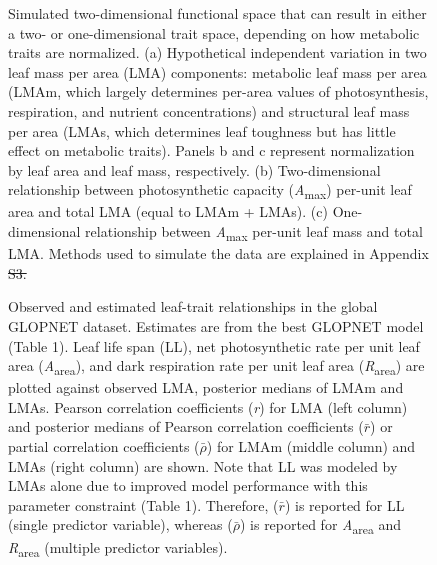 \documentclass[
  12pt,
  letterpaper,
  DIV=11,
  numbers=noendperiod]{scrartcl}
\providecommand{\DIFadd}[1]{{\protect\color{blue}\uwave{#1}}} %
\providecommand{\DIFdel}[1]{{\protect\color{red}\sout{#1}}}                      %
\providecommand{\DIFaddbegin}{} %
\providecommand{\DIFaddend}{} %
\providecommand{\DIFaddFL}[1]{\DIFadd{#1}} %
\providecommand{\DIFdelFL}[1]{\DIFdel{#1}} %
\providecommand{\DIFaddbeginFL}{} %
\providecommand{\DIFaddendFL}{} %
\providecommand{\DIFdelbeginFL}{} %
\providecommand{\DIFdelendFL}{} %
\newcommand{\DIFscaledelfig}{0.5}
\newlength{\DIFdelgraphicswidth} %
\newlength{\DIFdelgraphicsheight} %
\newcommand{\DIFaddincludegraphics}[2][]{{\color{blue}\fbox{\DIFOincludegraphics[#1]{#2}}}} %
\newcommand{\DIFdelincludegraphics}[2][]{%
\sbox{\DIFdelgraphicsbox}{\DIFOincludegraphics[#1]{#2}}%
\settoboxwidth{\DIFdelgraphicswidth}{\DIFdelgraphicsbox} %
\settoboxtotalheight{\DIFdelgraphicsheight}{\DIFdelgraphicsbox} %
\scalebox{\DIFscaledelfig}{%
\parbox[b]{\DIFdelgraphicswidth}{\usebox{\DIFdelgraphicsbox}\\[-\baselineskip] \rule{\DIFdelgraphicswidth}{0em}}\llap{\resizebox{\DIFdelgraphicswidth}{\DIFdelgraphicsheight}{%
\setlength{\unitlength}{\DIFdelgraphicswidth}%
\begin{picture}(1,1)%
\thicklines\linethickness{2pt} %
{\color[rgb]{1,0,0}\put(0,0){\framebox(1,1){}}}%
{\color[rgb]{1,0,0}\put(0,0){\line( 1,1){1}}}%
{\color[rgb]{1,0,0}\put(0,1){\line(1,-1){1}}}%
\end{picture}%
}\hspace*{3pt}}} %
} %
\DeclareRobustCommand{\DIFaddbegin}{\DIFOaddbegin \let\includegraphics\DIFaddincludegraphics} %
\DeclareRobustCommand{\DIFaddend}{\DIFOaddend \let\includegraphics\DIFOincludegraphics} %
\DeclareRobustCommand{\DIFaddbeginFL}{\DIFOaddbeginFL \let\includegraphics\DIFaddincludegraphics} %
\DeclareRobustCommand{\DIFaddendFL}{\DIFOaddendFL \let\includegraphics\DIFOincludegraphics} %
\DeclareRobustCommand{\DIFdelbeginFL}{\DIFOdelbeginFL \let\includegraphics\DIFdelincludegraphics} %
\DeclareRobustCommand{\DIFdelendFL}{\DIFOaddendFL \let\includegraphics\DIFOincludegraphics} %
\begin{document}
\newpage

\begin{figure}


\caption{\label{fig-hypo}Simulated two-dimensional functional space that
can result in either a two- or one-dimensional trait space, depending on
how metabolic traits are normalized. (a) Hypothetical independent
variation in two leaf mass per area (LMA) components: metabolic leaf
mass per area (LMAm, which largely determines per-area values of
photosynthesis, respiration, and nutrient concentrations) and structural
leaf mass per area (LMAs, which determines leaf toughness but has little
effect on metabolic traits). Panels b and c represent normalization by
leaf area and leaf mass, respectively. (b) Two-dimensional relationship
between photosynthetic capacity (\emph{A}\textsubscript{max}) per-unit
leaf area and total LMA (equal to LMAm + LMAs). (c) One-dimensional
relationship between \emph{A}\textsubscript{max} per-unit leaf mass and
total LMA. Methods used to simulate the data are explained in Appendix
\DIFdelbeginFL \DIFdelFL{S3.}\DIFdelendFL \DIFaddbeginFL \DIFaddFL{S8}\DIFaddendFL }

\end{figure}%

\DIFaddbegin \newpage

\DIFaddend \begin{figure}


\caption{\label{fig-gl_point}Observed and estimated leaf-trait
relationships in the global GLOPNET dataset. Estimates are from the best
GLOPNET model (Table 1). Leaf life span (LL), net photosynthetic rate
per unit leaf area (\emph{A}\textsubscript{area}), and dark respiration
rate per unit leaf area (\emph{R}\textsubscript{area}) are plotted
against observed LMA, posterior medians of LMAm and LMAs. Pearson
correlation coefficients (\emph{r}) for LMA (left column) and posterior
medians of Pearson correlation coefficients (\(\bar{r}\)) or partial
correlation coefficients (\(\bar{\rho}\)) for LMAm (middle column) and
LMAs (right column) are shown. Note that LL was modeled by LMAs alone
due to improved model performance with this parameter constraint (Table
1). Therefore, (\(\bar{r}\)) is reported for LL (single predictor
variable), whereas (\(\bar{\rho}\)) is reported for
\emph{A}\textsubscript{area} and \emph{R}\textsubscript{area} (multiple
predictor variables).}

\end{figure}%
\end{document}
